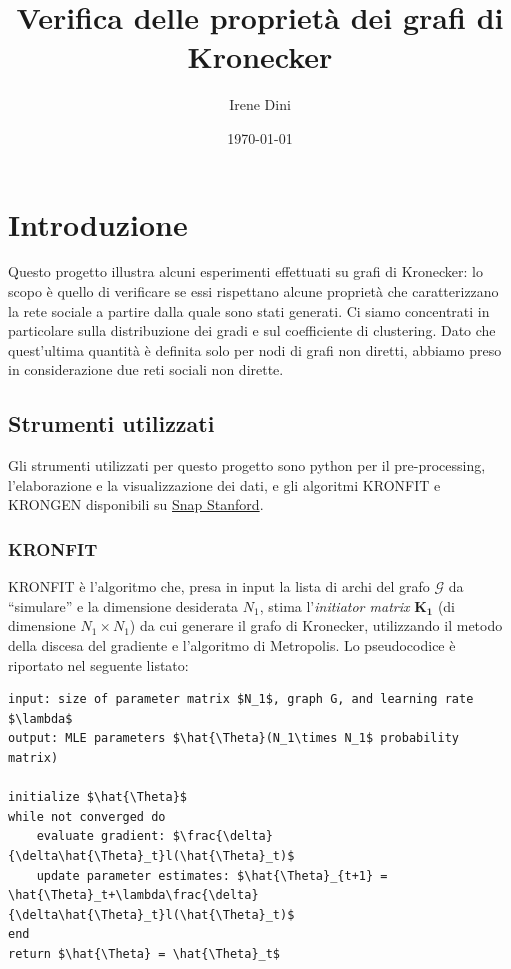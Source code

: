 \documentclass[12pt]{scrartcl}
\title{Verifica delle proprietà dei grafi di Kronecker}
\author{Irene Dini}
\date{\today}
\begin{document}
\maketitle
\newpage

\section{Introduzione}

Questo progetto illustra alcuni esperimenti effettuati su grafi di Kronecker: lo scopo è quello di verificare se essi rispettano alcune proprietà che caratterizzano la rete sociale a partire dalla quale sono stati generati. Ci siamo concentrati in particolare sulla distribuzione dei gradi e sul coefficiente di clustering. Dato che quest'ultima quantità è definita solo per nodi di grafi non diretti, abbiamo preso in considerazione due reti sociali non dirette.

\subsection{Strumenti utilizzati}

Gli strumenti utilizzati per questo progetto sono python per il pre-processing, l'elaborazione e la visualizzazione dei dati, e gli algoritmi \textsf{KRONFIT} e \textsf{KRONGEN} disponibili su \href{http://snap.stanford.edu/snap/download.html}{Snap Stanford}.

\subsubsection{KRONFIT}
\textsf{KRONFIT} è l'algoritmo che, presa in input la lista di archi del grafo $\mathcal{G}$ da ``simulare'' e la dimensione desiderata $N_1$, stima l'\textit{initiator matrix} $\mathbf{K_1}$ (di dimensione $N_1\times N_1$) da cui generare il grafo di Kronecker, utilizzando il metodo della discesa del gradiente e l'algoritmo di Metropolis. Lo pseudocodice è riportato nel seguente listato:

\begin{lstlisting}[mathescape=true, style=mystyle]
input: size of parameter matrix $N_1$, graph G, and learning rate $\lambda$
output: MLE parameters $\hat{\Theta}(N_1\times N_1$ probability matrix)

initialize $\hat{\Theta}$
while not converged do
	evaluate gradient: $\frac{\delta}{\delta\hat{\Theta}_t}l(\hat{\Theta}_t)$
	update parameter estimates: $\hat{\Theta}_{t+1} = \hat{\Theta}_t+\lambda\frac{\delta}{\delta\hat{\Theta}_t}l(\hat{\Theta}_t)$
end
return $\hat{\Theta} = \hat{\Theta}_t$
\end{lstlisting}
\end{document}
